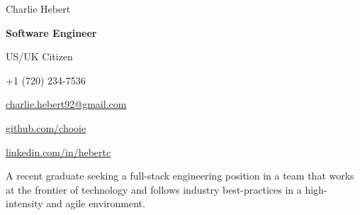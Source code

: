 \begin{center}
  {\Huge Charlie Hebert}
  
  \textbf{Software Engineer}

  US/UK Citizen
\end{center}

\noindent
\begin{minipage}[t]{0.5\textwidth}
  \begin{description}
    \raggedright
    \item[Mobile] +1 (720) 234-7536
    \item[Email] \href{mailto:charlie.hebert92@gmail.com}{charlie.hebert92@gmail.com}
  \end{description}
\end{minipage}
\noindent
\noindent
\begin{minipage}[t]{0.5\textwidth}
  \begin{description}
    \raggedleft
    \item[Github] \href{http://www.github.com/chooie}{github.com/chooie}
    \item[LinkedIn] \href{http://linkedin.com/in/hebertc}{linkedin.com/in/hebertc}
  \end{description}
\end{minipage}
\noindent

\begin{center}
  A recent graduate seeking a full-stack engineering position in a team that works at the frontier of technology and follows industry best-practices in a high-intensity and agile environment.
\end{center}

